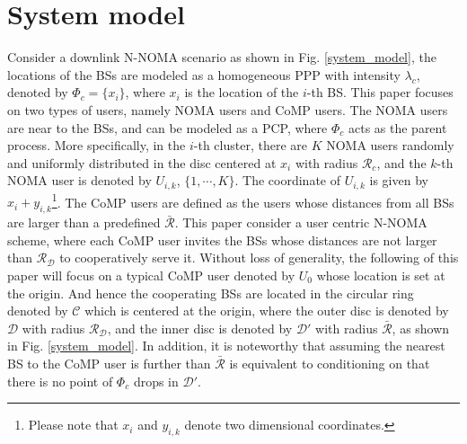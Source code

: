\documentclass[10pt, doublecolumn]{IEEEtran}
\begin{document}
\section{System model}
Consider a downlink N-NOMA scenario as shown in Fig. \ref{system_model},  the locations of the BSs are modeled as a homogeneous PPP with intensity $\lambda_c$, denoted by $\Phi_c=\{x_i\}$, where $x_i$ is the location of the $i$-th BS. This paper focuses on two types of users, namely NOMA users and CoMP users.
The NOMA users are near to the BSs, and can be modeled as a PCP, where $\Phi_c$ acts as the parent process\cite{haenggi2012stochastic}. More specifically, in the $i$-th cluster, there are $K$ NOMA users randomly and uniformly distributed in the disc centered at $x_i$ with radius $\mathcal{R}_c$, and the $k$-th NOMA user is denoted by $U_{i,k}$, $\{1,\cdots,K\}$.
The coordinate of $U_{i,k}$ is given by $x_i+y_{i,k}$\footnote{{\color{black}Please note that $x_i$ and $y_{i,k}$ denote two dimensional coordinates.}}.
The CoMP users are defined as the users whose distances from all BSs are larger than a predefined $\bar{\mathcal{R}}$. This paper consider a user centric N-NOMA scheme,  where each CoMP user invites the BSs whose distances are not larger than $\mathcal{R}_{\mathcal{D}}$ to cooperatively  serve it. Without loss of generality, the following of this paper will focus on a typical CoMP user denoted by $U_0$ whose location is set at the origin. And hence the cooperating BSs are located in the circular ring denoted by $\mathcal{C}$ which is centered at the origin, where the outer disc is denoted by $\mathcal{D}$ with radius $\mathcal{R}_{\mathcal{D}}$, and the inner disc is denoted by $\mathcal{D}'$ with radius $\bar{\mathcal{R}}$, as shown in Fig. \ref{system_model}. In addition, it is noteworthy that assuming the nearest BS to the CoMP user is further than $\bar{\mathcal{R}}$ is equivalent to conditioning on that there is no point of $\Phi_c$ drops in $\mathcal{D}'$.
\end{document}
